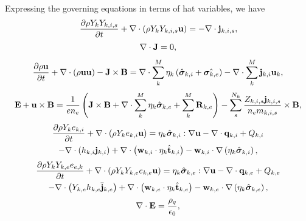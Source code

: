 \documentclass[a4paper,11pt]{report}
\begin{document}
Expressing the governing equations in terms of hat variables, we have
\begin{equation}
    \label{eq:sf_mm_ms_ni_hat}
    \frac{\partial \rho Y_k Y_{k,i,s}}{\partial t} + \nabla \cdot \left( \rho Y_k Y_{k,i,s} \mathbf{u} \right) = -\nabla \cdot \mathbf{j}_{k,i,s},
\end{equation}
\begin{equation}
    \label{eq:sf_mm_ms_ne_hat}
    \nabla \cdot \mathbf{J} = 0,
\end{equation}
\begin{equation}
    \label{eq:sf_mm_ms_ui_hat}
    \frac{\partial \rho \mathbf{u}}{\partial t} + \nabla \cdot \left( \rho \mathbf{u} \mathbf{u} \right) - \mathbf{J} \times \mathbf{B} = \nabla \cdot \sum_k^M \eta_k \left( \hat{\bm \sigma}_{k,i} + \hat{\bm \sigma_{k,e}} \right) - \nabla \cdot \sum_k^M \mathbf{j}_{k,i} \mathbf{u}_{k},
\end{equation}
\begin{equation}
    \label{eq:sf_mm_ms_ue_hat}
    \mathbf{E} + \mathbf{u} \times \mathbf{B} = \frac{1}{e n_e} \left( \mathbf{J} \times \mathbf{B} + \nabla \cdot \sum_k^M \eta_k \hat{\bm \sigma}_{k,e} + \sum_k^M \mathbf{R}_{k,e} \right) - \sum_s^{N_k} \frac{Z_{k,i,s} \mathbf{j}_{k,i,s}}{n_e m_{k,i,s}} \times \mathbf{B},
\end{equation}
\begin{multline}
    \label{eq:sf_mm_ms_iei_hat}
    \frac{\partial \rho Y_k e_{k,i}}{\partial t} + \nabla \cdot \left( \rho Y_k e_{k,i} \mathbf{u} \right) = \eta_k \hat{\bm \sigma}_{k,i} : \nabla \mathbf{u} - \nabla \cdot \mathbf{q}_{k,i} + Q_{k,i} \\
    - \nabla \cdot \left( h_{k,i} \mathbf{j}_{k,i} \right) + \nabla \cdot \left( \mathbf{w}_{k,i} \cdot \eta_k \hat{\mathbf{t}}_{k,i} \right) - \mathbf{w}_{k,i} \cdot \nabla \left( \eta_k \hat{\bm \sigma}_{k,i} \right),
\end{multline}
\begin{multline}
    \label{eq:sf_mm_ms_iee_hat}
    \frac{\partial \rho Y_k Y_{k,e} e_{e,k}}{\partial t} + \nabla \cdot \left( \rho Y_k Y_{k,e} e_{k,e} \mathbf{u} \right) = \eta_k \hat{\bm \sigma}_{k,e} : \nabla \mathbf{u} - \nabla \cdot \mathbf{q}_{k,e} + Q_{k,e} \\
    - \nabla \cdot \left( Y_{k,e} h_{k,e} \bar{\mathbf{j}}_{k,e} \right) + \nabla \cdot \left( \mathbf{w}_{k,e} \cdot \eta_k \hat{\mathbf{t}}_{k,e} \right) - \mathbf{w}_{k,e} \cdot \nabla \left( \eta_k \hat{\bm \sigma}_{k,e} \right),
\end{multline}
\begin{equation}
    \label{eq:sf_mm_ms_maxwell_3_hat}
    \nabla \cdot \mathbf{E} = \frac{\rho_q}{\epsilon_0},
\end{equation}
\end{document}

